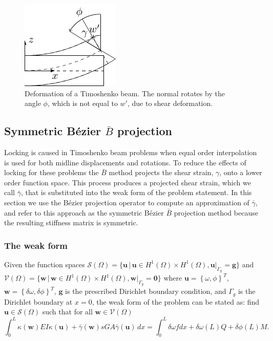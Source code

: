 \documentclass{article}
\newcommand{\Bezier}{{B\'{e}zier} }
\begin{document}
\begin{figure}[ht]
  \centering
  \includegraphics[width=0.25\linewidth]{timoshenko_beam_shape}
  \caption{Deformation of a Timoshenko beam. The normal rotates by the angle $\phi$, which is not equal to $w'$, due to shear deformation.}
  \label{fig:Timoshenko_beam_cross}
\end{figure}

\subsection{Symmetric \Bezier $\bar{B}$ projection}
\label{sec:symmetric-projection}
{\color{blue}Locking is caused in Timoshenko beam problems when equal order interpolation is used for both midline displacements and rotations. To reduce the effects of locking for these problems the $\bar{B}$ method projects the shear strain, $\gamma$, onto a lower order function space. This process produces a projected shear strain, which we call $\bar{\gamma}$,  that is substituted into the weak form of the problem statement. In this section we use the \Bezier projection operator to compute an approximation of $\bar{\gamma}$, and refer to this approach as the symmetric \Bezier $\bar{B}$ projection method because the resulting stiffness matrix is symmetric.}

\subsubsection{The weak form}

\sloppy Given the function spaces $\mathcal{S}(\Omega)=\{{\mathbf{u} \, \vert \, {\mathbf{u}\in{H^1(\Omega)\times{H^1(\Omega)}}},\mathbf{u}\vert_{\Gamma_{g}}=\mathbf{g}}\}$ and $\mathcal{V}(\Omega)=\{{\mathbf{w} \, \vert \, {\mathbf{w}\in{H^1(\Omega)\times{H^1(\Omega)}}}, \allowbreak \mathbf{w}\vert_{\Gamma_{g}}=\mathbf{0}}\}$ where $\mathbf{u}=\left\{{\omega,\phi}\right\}^T$, $\mathbf{w}=\left\{{\delta\omega,\delta\phi}\right\}^T$, $\mathbf{g}$ is the prescribed Dirichlet boundary condition, and $\Gamma_g$ is the Dirichlet boundary at $x=0$, the weak form of the problem can be stated as: find $\mathbf{u}\in{\mathcal{S}(\Omega)}$ such that for all $\mathbf{w}\in{\mathcal{V}(\Omega)}$
\begin{equation}
    {\int_{0}^L\kappa(\mathbf{w})EI\kappa(\mathbf{u}) + \bar{\gamma}(\mathbf{w})sGA\bar{\gamma}(\mathbf{u})} \, dx=\int_0^L\delta\omega f dx+\delta\omega(L)Q+\delta\phi(L)M.
\end{equation}
\end{document}
